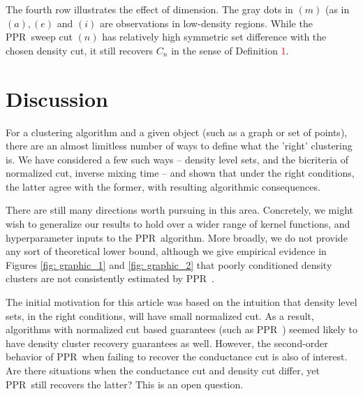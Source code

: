 \documentclass{article}
\newcommand{\1}{\mathbf{1}}
\newcommand{\pprspace}{{\sc PPR~}}
\theoremstyle{aldenthm}
\theoremstyle{aldenrmrk}
\begin{document}
The fourth row illustrates the effect of dimension. The gray dots in $(m)$ (as in $(a), (e)$ and $(i)$ are observations in low-density regions. While the \pprspace sweep cut $(n)$ has relatively high symmetric set difference with the chosen density cut, it still recovers $C_n$ in the sense of Definition \textcolor{red}{1}.


\section{Discussion}
\label{sec: discussion}
For a clustering algorithm and a given object (such as a graph or set of points), there are an almost limitless number of ways to define what the 'right' clustering is. We have considered a few such ways -- density level sets, and the bicriteria of normalized cut, inverse mixing time -- and shown that under the right conditions, the latter agree with the former, with resulting algorithmic consequences.

There are still many directions worth pursuing in this area. Concretely, we might wish to generalize our results to hold over a wider range of kernel functions, and hyperparameter inputs to the \pprspace algorithm. More broadly, we do not provide any sort of theoretical lower bound, although we give empirical evidence in Figures \ref{fig: graphic_1} and \ref{fig: graphic_2} that poorly conditioned density clusters are not consistently estimated by \pprspace.

The initial motivation for this article was based on the intuition that density level sets, in the right conditions, will have small normalized cut. As a result, algorithms with normalized cut based guarantees (such as \pprspace) seemed likely to have density cluster recovery guarantees as well. However, the second-order behavior of \pprspace when failing to recover the conductance cut is also of interest. Are there situations when the conductance cut and density cut differ, yet \pprspace still recovers the latter? This is an open question.

\clearpage



\end{document}
